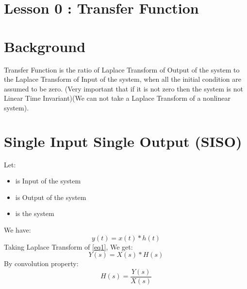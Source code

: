 \documentclass[12pt,a4paper]{article}
\begin{document}
	\section*{\centering Lesson 0 : Transfer Function}
	\section{Background}
	Transfer Function is the ratio of Laplace Transform of Output of the system to the Laplace Transform of Input of the system, when all the initial condition are assumed to be zero. (Very important that if it is not zero then the system is not Linear Time Invariant)(We can not take a Laplace Transform of a nonlinear system).
	\section{Single Input Single Output (SISO)}
	Let:
	\begin{itemize}
		\item { is Input of the system}
		\item { is Output of the system}
		\item { is the system}
	\end{itemize}
	We have:
	\begin{equation}
		y(t) = x(t)*h(t)
		\label{eq1}
	\end{equation}
	Taking Laplace Transform of \autoref{eq1}, We get:
	\begin{equation}
		Y(s) = X(s)*H(s)
		\label{eq2}
	\end{equation}
	By convolution property:
	\begin{equation}
		\boxed{
			H(s) = \frac{Y(s)}{X(s)}
		}
		\label{eq3}
	\end{equation}
	
	
\end{document}
